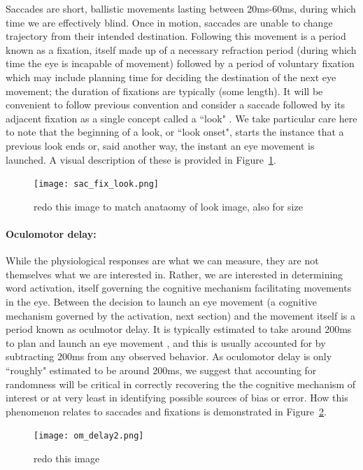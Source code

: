 Saccades are short, ballistic movements lasting between 20ms-60ms, during which time we are effectively blind. Once in motion, saccades are unable to change trajectory from their intended destination. Following this movement is a period known as a fixation, itself made up of a necessary refraction period (during which time the eye is incapable of movement) followed by a period of voluntary fixation which may include planning time for deciding the destination of the next eye movement; the duration of fixations are typically (some length). It will be convenient to follow previous convention and consider a saccade followed by its adjacent fixation as a single concept called a ``look" \cite{mcmurray2002look}. We take particular care here to note that the beginning of a look, or ``look onset", starts the instance that a previous look ends or, said another way, the instant an eye movement is launched. A visual description of these is provided in Figure~\ref{fig:sac_fix_look}.



\begin{figure}[H]
\centering
\texttt{[image: sac\_fix\_look.png]}
\caption{redo this image to match anataomy of look image, also for size}
\label{fig:sac_fix_look}
\end{figure}

\paragraph{Oculomotor delay:} While the physiological responses are what we can measure, they are not themselves what we are interested in. Rather, we are interested in determining word activation, itself governing the cognitive mechanism facilitating movements in the eye. Between the decision to launch an eye movement (a cognitive mechanism governed by the activation, next section) and the movement itself is a period known as oculmotor delay. It is typically estimated to take around 200ms to plan and launch an eye movement \cite{viviani1990time}, and this is usually accounted for by subtracting 200ms from any observed behavior. As oculomotor delay is only ``roughly" estimated to be around 200ms, we suggest that accounting for randomness will be critical in correctly recovering the the cognitive mechanism of interest or at very least in identifying possible sources of bias or error. How this phenomenon relates to saccades and fixations is demonstrated in Figure~\ref{fig:sac_fix_look_om}.


\begin{figure}[H]
\centering
\texttt{[image: om\_delay2.png]}
\caption{redo this image}
\label{fig:sac_fix_look_om}
\end{figure}


